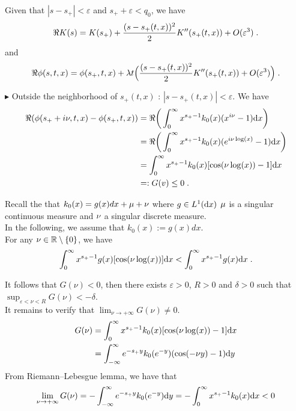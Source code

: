 \documentclass[11pt]{amsart}
\begin{document}
Given that $|s - s_+| < \varepsilon$ and $s_+ + \varepsilon < q_0$, we have 
    \begin{equation}
        \Re K(s) = K(s_+) + \frac{(s - s_+(t,x))^2}{2} K''(s_+(t,x)) + O(\varepsilon^3)
        \; .
    \end{equation}
and 
    \begin{equation}
        \Re \phi(s, t, x) = \phi(s_+, t, x) + \lambda t \Big(\frac{(s - s_+(t,x))^2}{2} K''(s_+(t,x)) + O(\varepsilon^3)\Big)
        \; .
    \end{equation}

    
$\blacktriangleright$ Outside the neighborhood of $s_+(t,x)$ : $|s - s_+(t,x)| < \varepsilon$. We have
    \begin{align*}
        \Re(\phi(s_+ + i \nu, t, x) - \phi(s_+, t, x)) 
        &=
        \Re \bigg( \int_0^\infty x^{s_+ - 1}k_0(x) (x^{i\nu} - 1) \mathrm dx \bigg) \\
        &=
        \Re \bigg( \int_0^\infty x^{s_+ - 1}k_0(x) (e^{i\nu \log(x)}- 1) \mathrm dx \bigg) \\ 
        &= 
        \int_0^\infty x^{s_+ - 1}k_0(x) [\cos(\nu \log(x))- 1] \mathrm dx  \\
        &=: G(v) \leq 0
        \; .
    \end{align*}
    
Recall the that $k_0(x) = g(x)dx + \mathrm \mu + \mathrm \nu$ where
$g \in L^1(\mathrm dx)$
$\mathrm \mu$ is a singular continuous measure and $\mathrm \nu$ a singular discrete measure.\\ 

In the following, we assume that $k_0(x) :=  g(x)dx$.\\

For any $\nu \in \mathbb{R} \setminus \{0\}$, we have
\begin{equation}
     \int_0^\infty x^{s_+ - 1}g(x) [\cos(\nu \log(x))] \mathrm dx < \int_0^\infty x^{s_+ - 1}g(x) \mathrm dx
     \; .
\end{equation}

It follows that $G(\nu) < 0$, then there exists $\varepsilon > 0$, $R >0$ and $\delta > 0$
 such that $\sup_{\varepsilon < \nu < R}G(\nu) < - \delta$.\\
 
 It remains to verify that $\lim_{\nu \to +\infty}G(\nu) \neq 0$. 
    \begin{align*}
        G(\nu) 
        &=  \int_0^\infty x^{s_+ - 1}k_0(x) [\cos(\nu \log(x))- 1] \mathrm dx \\
        &=  \int_{-\infty}^\infty e^{-s_+ y}k_0(e^{-y})(\cos(-\nu y) - 1 )\mathrm dy
        \end{align*}
From Riemann–Lebesgue lemma, we have that 
    \begin{equation}
        \lim_{\nu \to +\infty}G(\nu) = - \int_{-\infty}^\infty e^{-s_+ y}k_0(e^{-y})\mathrm dy = - \int_{0}^\infty x^{s_+ - 1}k_0(x)\mathrm dx < 0
    \end{equation}
    
\end{document}
